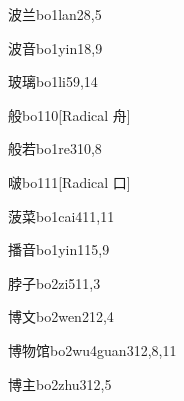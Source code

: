 \begin{verbete}{波兰}{bo1lan2}{8,5}
\end{verbete}

\begin{verbete}{波音}{bo1yin1}{8,9}
\end{verbete}

\begin{verbete}{玻璃}{bo1li5}{9,14}
\end{verbete}

\begin{verbete}{般}{bo1}{10}[Radical 舟]
\end{verbete}

\begin{verbete}{般若}{bo1re3}{10,8}
\end{verbete}

\begin{verbete}{啵}{bo1}{11}[Radical 口]
\end{verbete}

\begin{verbete}{菠菜}{bo1cai4}{11,11}
\end{verbete}

\begin{verbete}{播音}{bo1yin1}{15,9}
\end{verbete}

\begin{verbete}{脖子}{bo2zi5}{11,3}
\end{verbete}

\begin{verbete}{博文}{bo2wen2}{12,4}
\end{verbete}

\begin{verbete}{博物馆}{bo2wu4guan3}{12,8,11}
\end{verbete}

\begin{verbete}{博主}{bo2zhu3}{12,5}
\end{verbete}


